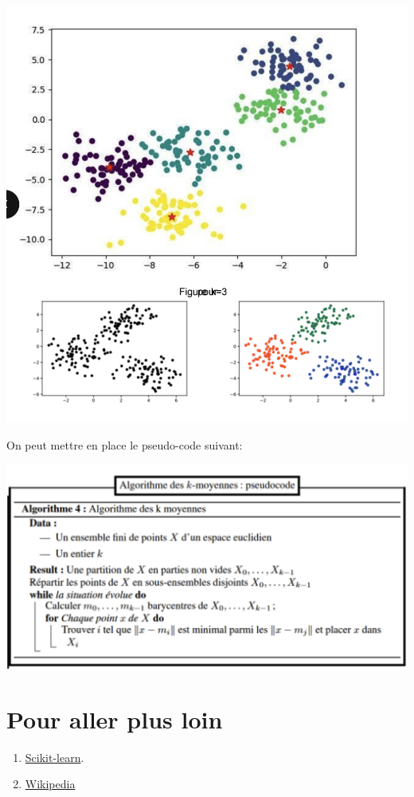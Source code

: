 \documentclass[a0,portrait]{a0poster}
\begin{document}
\begin{center}\vspace{1cm}
\includegraphics[width=0.3\linewidth]{exemple_kmean.png}
\end{center}\vspace{1cm}

On peut mettre en place le pseudo-code suivant:

\begin{center}\vspace{1cm}
\includegraphics[width=0.3\linewidth]{pseudo_code.png}
\end{center}\vspace{1cm}

\color{DarkSlateGray} %


\nocite{*} %


\section*{Pour aller plus loin}

\begin{enumerate}
    \item \href{https://scikit-learn.org}{Scikit-learn}.
    \item \href{https://fr.wikipedia.org/wiki/K-moyennes}{Wikipedia}
\end{enumerate}


\end{document}

